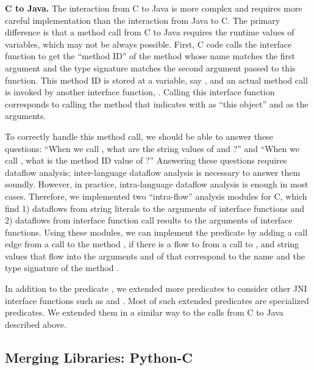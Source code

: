 \textbf{C to Java.} The interaction from C to Java is more complex and
requires more careful implementation than the interaction from Java to C.
The primary difference is that a method call from C to Java requires
the runtime values of variables, which may not be always possible.
First, C code calls the interface function 
to get the ``method ID'' of the method whose name matches the first argument
and the type signature matches the second argument passed to this function.
This method ID is stored at a variable, say , and
an actual method call is invoked by another
interface function, . Calling this interface 
function corresponds to calling the method that  indicates
with  as ``this object'' and  as the arguments.

To correctly handle this method call, we should be able to answer these
questions: ``When we call ,
what are the string values of  and ?'' and
``When we call , what is the method ID value of ?''
Answering these questions requires dataflow analysis;
inter-language dataflow analysis is necessary to answer them soundly.
However, in practice, intra-language dataflow analysis is enough in most cases.
Therefore, we implemented two ``intra-flow'' analysis modules for C,
which find 1) dataflows from string literals to the arguments of interface functions
and 2) dataflows from interface function call results to the arguments of interface functions.
Using these modules, we can implement the
predicate  by adding a call edge from a 
call to the method , if there is a flow to  from a
call to , and string values that flow into the
arguments  and  of  that
correspond to the name and the type signature of the method .

In addition to the predicate ,
we extended more predicates to consider other JNI interface functions such as
 and .
Most of such extended predicates are specialized  predicates.
We extended them in a similar way to the calls from C to Java described above.

\subsection{Merging Libraries: Python-C}\label{sec:merging2}

